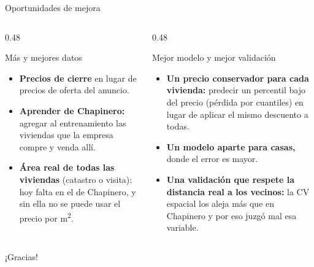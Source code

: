 \documentclass[aspectratio=169, 10pt]{beamer}
\begin{document}
\begin{frame}{Oportunidades de mejora}
  \vspace{2mm}
  \begin{columns}[T, onlytextwidth]
    \begin{column}{0.48\textwidth}
      \begin{alertblock}{M\'as y mejores datos}
        \footnotesize
        \begin{itemize}\setlength{\itemsep}{2pt}
          \item \textbf{Precios de cierre} en lugar de precios de oferta del anuncio.
          \item \textbf{Aprender de Chapinero:} agregar al entrenamiento las viviendas que la empresa compre y venda all\'i.
          \item \textbf{\'Area real de todas las viviendas} (catastro o visita): hoy falta en el \PctSuperficieImputada{} de Chapinero, y sin ella no se puede usar el precio por m\textsuperscript{2}.
        \end{itemize}
      \end{alertblock}
    \end{column}
    \begin{column}{0.48\textwidth}
      \begin{alertblock}{Mejor modelo y mejor validaci\'on}
        \footnotesize
        \begin{itemize}\setlength{\itemsep}{2pt}
          \item \textbf{Un precio conservador para cada vivienda:} predecir un percentil bajo del precio (p\'erdida por cuantiles) en lugar de aplicar el mismo descuento a todas.
          \item \textbf{Un modelo aparte para casas,} donde el error es mayor.
          \item \textbf{Una validaci\'on que respete la distancia real a los vecinos:} la CV espacial los aleja m\'as que en Chapinero y por eso juzg\'o mal esa variable.
        \end{itemize}
      \end{alertblock}
    \end{column}
  \end{columns}
\end{frame}

\appendix

\begin{frame}[standout]
  ¡Gracias!
\end{frame}
\end{document}
